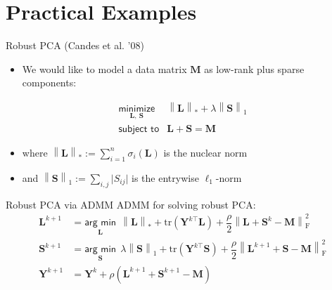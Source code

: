 \documentclass[aspectratio=169]{beamer}
\newcommand{\norm}[1]{\left\lVert#1\right\rVert}
\begin{document}
                \section*{Practical Examples}
                \begin{frame}{Robust PCA (Candes et al. '08)}
                  \begin{itemize}
                    \item We would like to model a data matrix $\bm M$ as low-rank plus sparse components:
                  \end{itemize}
                    {\huge
                    \begin{equation*}
                       \begin{array}{ll}
                         \underset{\bm L,~ \bm S}{\textsf{minimize}} & \norm{\bm L}_{*} + \lambda \norm{\bm S}_{1} \\
                         \textsf{subject to} & \bm L + \bm S = \bm M
                        \end{array}
                   \end{equation*}
                      }
                  \begin{itemize}
                    \item where $\norm{\bm L}_{*} := \sum_{i=1}^{n}\sigma_{i}(\bm{L})$ is the nuclear norm
                    \item and $\norm{\bm S}_1 := \sum_{i,j}\vert S_{ij}\vert$ is the entrywise $\ell_1$-norm
                  \end{itemize}
                \end{frame}
                \begin{frame}{Robust PCA via ADMM}
                  ADMM for solving robust PCA:
                  \begin{align*}
                    \bm L^{k+1} &= \underset{\bm L}{\textsf{arg~min}} ~~ \norm{\bm L}_{*} + \mathrm{tr}\left(\bm Y^{k\top} \bm L \right) + \dfrac{\rho}{2}\norm{\bm L + \bm S^k - \bm M}^2_{\textrm{F}}\\
                    \bm S^{k+1} &= \underset{\bm S}{\textsf{arg~min}} ~~ \lambda\norm{\bm S}_{1} + \mathrm{tr}\left(\bm Y^{k\top} \bm S \right) + \dfrac{\rho}{2}\norm{\bm L^{k+1} + \bm S - \bm M}^2_{\textrm{F}}\\
                    \bm Y^{k+1} &= \bm Y^k + \rho \left(\bm L^{k+1} + \bm S^{k+1} - \bm M\right)
                  \end{align*}
                \end{frame}
\end{document}
